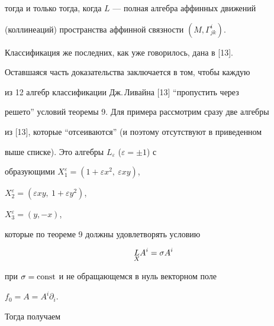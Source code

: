 тогда и только тогда, когда $L$ --- полная алгебра аффинных движений 


(коллинеаций) пространства аффинной связности $(M,\Gamma^i_{j k})$. 


Классификация же последних, как уже говорилось, дана в [13]. 


Оставшаяся часть доказательства заключается в том, чтобы каждую 


из 12 алгебр классификации Дж.\,Ливайна [13] ``пропустить через 


решето'' условий теоремы 9. Для примера рассмотрим сразу две алгебры 


из [13], которые ``отсеиваются'' (и поэтому отсутствуют в приведенном 


выше списке). Это алгебры $L_\varepsilon$ ($\varepsilon=\pm1$) с 


образующими $X^\varepsilon_1=(1+\varepsilon x^2,\ \varepsilon x y)$, 


$X^\varepsilon_2=(\varepsilon x y,\ 1+\varepsilon y^2)$, 


$X^\varepsilon_3=(y,-x)$, 


которые по теореме 9 должны удовлетворять условию 


$$ 


\down{X}{L}A^i=\sigma A^i 


$$ 


при $\sigma=\operatorname{const}$ и не обращающемся в нуль векторном поле 


$f_0=A=A^i\partial_i$. 


Тогда получаем 


